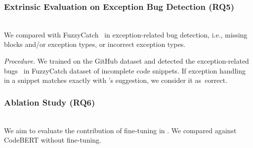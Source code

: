 




%

\vspace{2pt}
\subsubsection{Extrinsic Evaluation on Exception Bug Detection (RQ5)}~\\
 We compared with
FuzzyCatch~\cite{xrank-fse20} in exception-related bug detection,
i.e., missing  blocks and/or exception types, or incorrect
exception types.



{\em Procedure.} We trained {\tool} on the GitHub dataset and detected
the exception-related bugs~\cite{fuzzycatchbugs} in FuzzyCatch dataset of
incomplete code snippets. If exception handling in a snippet
matches exactly with {\tool}'s suggestion, we consider it as~correct.



\vspace{2pt}
\subsubsection{Ablation Study (RQ6)}~\\
We aim to evaluate the contribution of fine-tuning in {\tool}. We
compared {\tool} against CodeBERT without fine-tuning.
